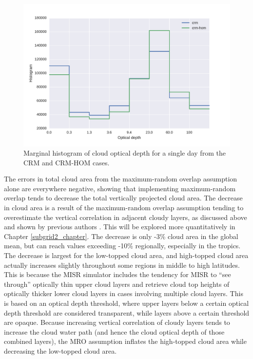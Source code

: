 \begin{figure}
\centering
\includegraphics[width=\columnwidth]{graphics/taudist_hom.pdf}
\caption{Marginal histogram of cloud optical depth for a single day from the CRM and CRM-HOM cases.}
\label{sg_cldtau_distribution}
\end{figure}

The errors in total cloud area from the maximum-random overlap assumption alone are everywhere negative, showing that implementing maximum-random overlap tends to decrease the total vertically projected cloud area. The decrease in cloud area is a result of the maximum-random overlap assumption tending to overestimate the vertical correlation in adjacent cloudy layers, as discussed above and shown by previous authors \citep{mace_and_benson-troth_2002, hogan_and_illingworth_2000, barker_2008}. This will be explored more quantitatively in Chapter \ref{subgrid2_chapter}. The decrease is only -3\% cloud area in the global mean, but can reach values exceeding -10\% regionally, especially in the tropics. The decrease is largest for the low-topped cloud area, and high-topped cloud area actually increases slightly throughout some regions in middle to high latitudes. This is because the MISR simulator includes the tendency for MISR to ``see through'' optically thin upper cloud layers and retrieve cloud top heights of optically thicker lower cloud layers in cases involving multiple cloud layers. This is based on an optical depth threshold, where upper layers below a certain optical depth threshold are considered transparent, while layers above a certain threshold are opaque. Because increasing vertical correlation of cloudy layers tends to increase the cloud water path (and hence the cloud optical depth of those combined layers), the MRO assumption inflates the high-topped cloud area while decreasing the low-topped cloud area.

